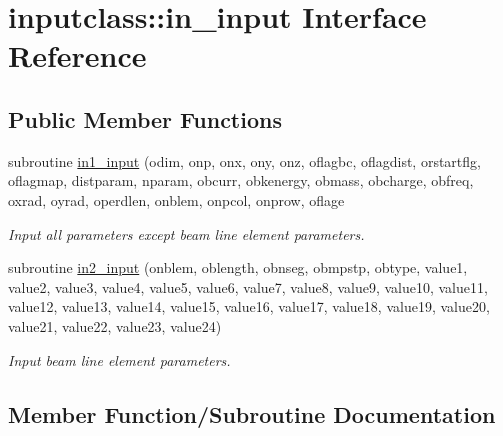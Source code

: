 \hypertarget{interfaceinputclass_1_1in__input}{}\section{inputclass\+::in\+\_\+input Interface Reference}
\label{interfaceinputclass_1_1in__input}
\subsection*{Public Member Functions}
\begin{DoxyCompactItemize}
\item 
subroutine \mbox{\hyperlink{interfaceinputclass_1_1in__input_a040b73cd783eedcee270410a9461dc44}{in1\+\_\+input}} (odim, onp, onx, ony, onz, oflagbc, oflagdist, orstartflg, oflagmap, distparam, nparam, obcurr, obkenergy, obmass, obcharge, obfreq, oxrad, oyrad, operdlen, onblem, onpcol, onprow, oflage
\begin{DoxyCompactList}\small\item\em Input all parameters except beam line element parameters. \end{DoxyCompactList}\item 
subroutine \mbox{\hyperlink{interfaceinputclass_1_1in__input_a1c3359c483146c1c034a2a7b9da6791f}{in2\+\_\+input}} (onblem, oblength, obnseg, obmpstp, obtype, value1, value2, value3, value4, value5, value6, value7, value8, value9, value10, value11, value12, value13, value14, value15, value16, value17, value18, value19, value20, value21, value22, value23, value24)
\begin{DoxyCompactList}\small\item\em Input beam line element parameters. \end{DoxyCompactList}\end{DoxyCompactItemize}


\subsection{Member Function/\+Subroutine Documentation}
\mbox{\label{interfaceinputclass_1_1in__input_a040b73cd783eedcee270410a9461dc44}} 
